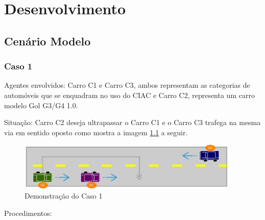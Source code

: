 \chapter[Desenvolvimento]{Desenvolvimento}

\section{Cenário Modelo}

\subsection{Caso 1}

Agentes envolvidos: Carro C1 e Carro C3, ambos representam as categorias de
automóveis que se enquadram no uso do CIAC e Carro C2, representa um carro
modelo Gol G3/G4 1.0.

Situação: Carro C2 deseja ultrapassar o Carro C1 e o Carro C3 trafega na mesma
via em sentido oposto como mostra a imagem \ref{fig:caso1} a seguir.

\begin{figure}[h]
  \centering
  \includegraphics[width=400px, scale=1]{figuras/caso1}
  \caption{Demonstração do Caso 1}
\label{fig:caso1}
\end{figure}

Procedimentos:

